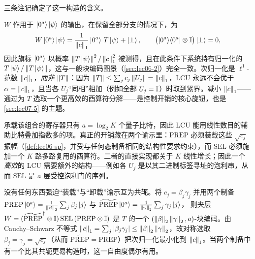 三条注记确定了这一构造的含义。

\begin{remark}
\label{rem:lec07-read}
$W$ 作用于 $\ket{0^a}\ket{\psi}$ 的输出，在保留全部分支的情况下，为
\begin{equation}
  W\ket{0^a}\ket{\psi}
  =\frac{1}{\left\lVert c \right\rVert_1}\ket{0^a}\,T\ket{\psi}+\ket{\perp},
  \qquad \bigl(\ket{0^a}\!\bra{0^a}\otimes\mathbb{I}\bigr)\ket{\perp}=0,
  \label{eq:lec07-output}
\end{equation}
因此旗标 $\ket{0^a}$ 以概率 $\left\lVert T\ket{\psi} \right\rVert^2/\left\lVert c \right\rVert_1^2$ 被测得，且在此条件下系统持有归一化的 $T\ket{\psi}/\left\lVert T\ket{\psi} \right\rVert$，这与一般块编码图景（\cref{sec:lec06-2}）完全一致。次归一化是 $\ell^1$-范数 $\left\lVert c \right\rVert_1$，\emph{而非} $\left\lVert T \right\rVert$：因为
$\left\lVert T \right\rVert\le\sum_j c_j\left\lVert U_j \right\rVert=\left\lVert c \right\rVert_1$，LCU 永远不会优于
$\alpha=\left\lVert c \right\rVert_1$，且当各 $U_j$“同相”相加（例如全部 $U_j=\mathbb{I}$）时取到紧界。减小 $\left\lVert c \right\rVert_1$——通过为 $T$ 选取一个更高效的酉算符分解——是控制开销的核心旋钮，也是 \cref{sec:lec07-5} 的主题。
\end{remark}

\begin{remark}[开销关于项数是对数的]
\label{rem:lec07-log}
承载该组合的寄存器只有 $a=\log_2 K$ 个量子比特，因此 LCU 能用线性数目的辅助比特叠加指数多的项。真正的开销藏在两个谕示里：$\mathrm{PREP}$ 必须装载这些 $\sqrt{c_j}$ 振幅（\cref{def:lec06-sp}，并受与任何态制备相同的结构性要求约束），而 $\mathrm{SEL}$ 必须施加一个 $K$ 路多路复用的酉算符。二者的直接实现都关于 $K$ 线性增长；因此一个\emph{高效}的 LCU 需要额外的结构——例如各 $U_j$ 是以其二进制标签寻址的泡利串，从而 $\mathrm{SEL}$ 是 $a$ 层受控泡利门的序列。
\end{remark}

\begin{remark}[系数的非对称拆分]
\label{rem:lec07-split}
没有任何东西强迫“装载”与“卸载”谕示互为共轭。将 $c_j=\beta_j\gamma_j$ 并用两个制备
$\mathrm{PREP}\ket{0^a}=\frac{1}{\left\lVert \beta \right\rVert_2}\sum_j\beta_j\ket{j}$ 与
$\widetilde{\mathrm{PREP}}\ket{0^a}=\frac{1}{\left\lVert \gamma \right\rVert_2}\sum_j\gamma_j\ket{j}$，
则夹层 $W=(\widetilde{\mathrm{PREP}}^{\dagger}\otimes\mathbb{I})\,\mathrm{SEL}\,
(\mathrm{PREP}\otimes\mathbb{I})$ 是 $T$ 的一个 $(\left\lVert \beta \right\rVert_2\left\lVert \gamma \right\rVert_2,a)$-块编码。由 Cauchy--Schwarz 不等式 $\left\lVert c \right\rVert_1=\sum_j\left\lvert \beta_j\gamma_j \right\rvert\le
\left\lVert \beta \right\rVert_2\left\lVert \gamma \right\rVert_2$，故对称选取
$\beta_j=\gamma_j=\sqrt{c_j}$（从而
$\widetilde{\mathrm{PREP}}=\mathrm{PREP}$）把次归一化最小化到 $\left\lVert c \right\rVert_1$。当两个制备中有一个比其共轭更易构造时，这一自由度偶尔有用。
\end{remark}

